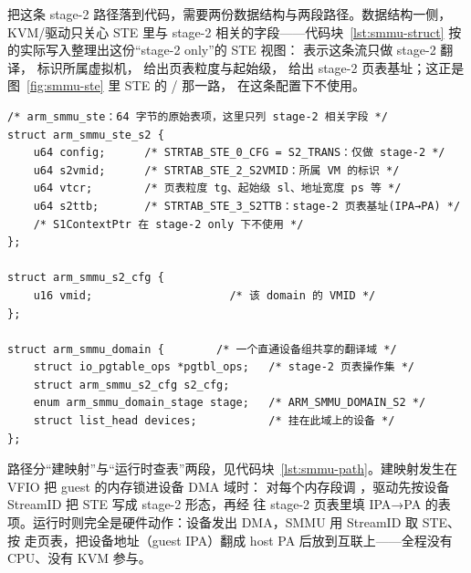 把这条 stage-2 路径落到代码，需要两份数据结构与两段路径。数据结构一侧，KVM/驱动只关心 STE 里与 stage-2 相关的字段——代码块~\ref{lst:smmu-struct} 按  的实际写入整理出这份“stage-2 only”的 STE 视图： 表示这条流只做 stage-2 翻译， 标识所属虚拟机， 给出页表粒度与起始级， 给出 stage-2 页表基址；这正是图~\ref{fig:smmu-ste} 里 STE 的 / 那一路， 在这条配置下不使用。

\begin{lstlisting}[caption={stage-2 only 的 STE 与 domain：SMMUv3 驱动里与 IPA→PA 相关的字段（arm-smmu-v3.h / arm-smmu-v3.c，整理）},label={lst:smmu-struct}]
/* arm_smmu_ste：64 字节的原始表项，这里只列 stage-2 相关字段 */
struct arm_smmu_ste_s2 {
    u64 config;      /* STRTAB_STE_0_CFG = S2_TRANS：仅做 stage-2 */
    u64 s2vmid;      /* STRTAB_STE_2_S2VMID：所属 VM 的标识 */
    u64 vtcr;        /* 页表粒度 tg、起始级 sl、地址宽度 ps 等 */
    u64 s2ttb;       /* STRTAB_STE_3_S2TTB：stage-2 页表基址(IPA→PA) */
    /* S1ContextPtr 在 stage-2 only 下不使用 */
};

struct arm_smmu_s2_cfg {
    u16 vmid;                     /* 该 domain 的 VMID */
};

struct arm_smmu_domain {        /* 一个直通设备组共享的翻译域 */
    struct io_pgtable_ops *pgtbl_ops;   /* stage-2 页表操作集 */
    struct arm_smmu_s2_cfg s2_cfg;
    enum arm_smmu_domain_stage stage;   /* ARM_SMMU_DOMAIN_S2 */
    struct list_head devices;           /* 挂在此域上的设备 */
};
\end{lstlisting}

路径分“建映射”与“运行时查表”两段，见代码块~\ref{lst:smmu-path}。建映射发生在 VFIO 把 guest 的内存锁进设备 DMA 域时： 对每个内存段调 ，驱动先按设备 StreamID 把 STE 写成 stage-2 形态，再经  往 stage-2 页表里填 IPA→PA 的表项。运行时则完全是硬件动作：设备发出 DMA，SMMU 用 StreamID 取 STE、按  走页表，把设备地址（guest IPA）翻成 host PA 后放到互联上——全程没有 CPU、没有 KVM 参与。

